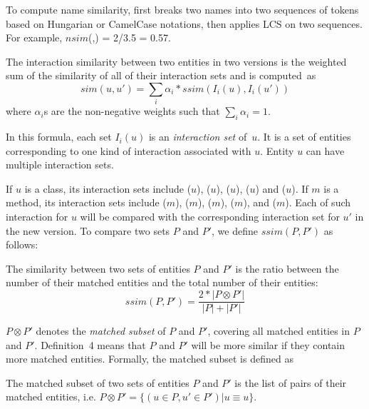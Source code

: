 To compute name similarity, {\tool} first breaks two names into
two sequences of tokens based on Hungarian or CamelCase notations,
then applies LCS on two sequences. For example,
$nsim$(,) = 2/3.5 = 0.57.

\begin{Definition}
The interaction similarity between two entities in two versions is the
weighted sum of the similarity of all of their interaction sets and is
computed~as
$$sim(u,u') = \sum_i{\alpha_i*ssim(I_i(u),I_i(u'))}$$ where
$\alpha_i$s are the non-negative weights such that $\sum_i{\alpha_i} =
1$.
\end{Definition}

In this formula, each set $I_i(u)$ is an {\em interaction set}
of~$u$. It is a set of entities corresponding to one kind of
interaction associated with $u$. Entity $u$ can have multiple
interaction sets. 

If $u$ is a class, its interaction sets include ($u$),
($u$), ($u$), ($u$) and
($u$). If $m$ is a method, its interaction sets include
($m$), ($m$), ($m$),
($m$), and ($m$).  Each of such
interaction for $u$ will be compared with the corresponding
interaction set for $u'$ in the new version. To compare two sets $P$
and $P'$, we define $ssim(P,P')$ as follows:


\begin{Definition}
The similarity between two sets of entities $P$ and $P'$ is the ratio
between the number of their matched entities and the total number of their
entities:
$$ssim(P,P') = \frac {2*|P \otimes P'|} {|P| + |P'|}$$
\end{Definition}

$P \otimes P'$ denotes the {\em matched subset} of $P$ and $P'$,
covering all matched entities in $P$ and $P'$. Definition~4 means
that $P$ and $P'$ will be more similar if they contain more matched
entities. Formally, the matched subset is defined as

\begin{Definition}
The matched subset of two sets of entities $P$ and $P'$ is the list of pairs of their matched entities, i.e. $P \otimes P' = \{(u \in P, u' \in P') |u \equiv u\}$.
\end{Definition}

